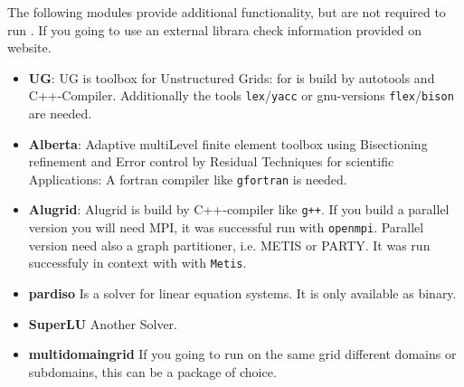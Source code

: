 The following modules provide additional functionality, but are not required to run \Dumux.
If you going to use an external librara check information provided on \Dune website.

\begin{itemize}
\item \textbf{UG}: UG is toolbox for Unstructured Grids: for \Dumux is build by autotools and C++-Compiler. Additionally the tools \texttt{lex}/\texttt{yacc} or gnu-versions \texttt{flex}/\texttt{bison} are needed. 

\item \textbf{Alberta}: Adaptive multiLevel finite element toolbox using Bisectioning refinement and Error control by Residual Techniques for scientific Applications: A fortran compiler like \texttt{gfortran} is needed.

\item \textbf{Alugrid}: Alugrid is build by C++-compiler like \texttt{g++}. If you build a parallel version you will need MPI, it was successful run with \texttt{openmpi}. Parallel version need also a graph partitioner, i.e. METIS or PARTY. It was run successfuly in context with \Dune with \texttt{Metis}.


\item \textbf{pardiso} Is a solver for linear equation systems. It is only available as binary.

\item \textbf{SuperLU} Another Solver.

\item \textbf{\Dune multidomaingrid} If you going to run on the same grid different domains or subdomains, this can be a package of choice.
\end{itemize}

